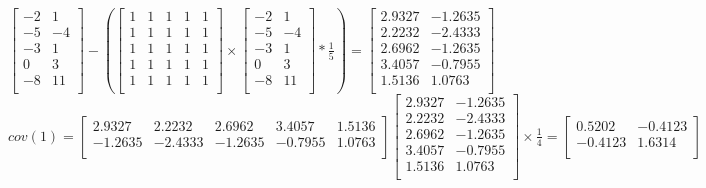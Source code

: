 \documentclass[12pt]{article}
\begin{document}
\begin{center}
    $
    \begin{bmatrix}
        -2 & 1\\
        -5 & -4\\
        -3 & 1\\
        0 & 3\\
        -8 & 11\\
    \end{bmatrix}
    -
    \left(
    \begin{bmatrix}
        1 & 1 & 1 & 1 & 1\\
        1 & 1 & 1 & 1 & 1\\
        1 & 1 & 1 & 1 & 1\\
        1 & 1 & 1 & 1 & 1\\
        1 & 1 & 1 & 1 & 1\\
    \end{bmatrix}
    \times
    \begin{bmatrix}
        -2 & 1\\
        -5 & -4\\
        -3 & 1\\
        0 & 3\\
        -8 & 11\\
    \end{bmatrix}
    * \frac{1}{5}
    \right)
    =
    \begin{bmatrix}
        2.9327 & -1.2635\\
        2.2232 &  -2.4333\\
        2.6962 & -1.2635\\
        3.4057 & -0.7955\\
        1.5136 & 1.0763\\
    \end{bmatrix}
    $
    \\[0.1 in]
    $
    cov(1) =
    \begin{bmatrix}
        2.9327 & 2.2232 & 2.6962 &   3.4057& 1.5136\\
        -1.2635 & -2.4333 & -1.2635 &-0.7955 &   1.0763\\
    \end{bmatrix}
    \begin{bmatrix}
        2.9327 & -1.2635\\
        2.2232 & -2.4333\\
        2.6962 &  -1.2635\\
        3.4057 & -0.7955\\
        1.5136 & 1.0763\\
    \end{bmatrix}
    \times \frac{1}{4}
    =
    \begin{bmatrix}
        0.5202& -0.4123\\
        -0.4123 & 1.6314\\
    \end{bmatrix}
    $
\end{center}
\end{document}
